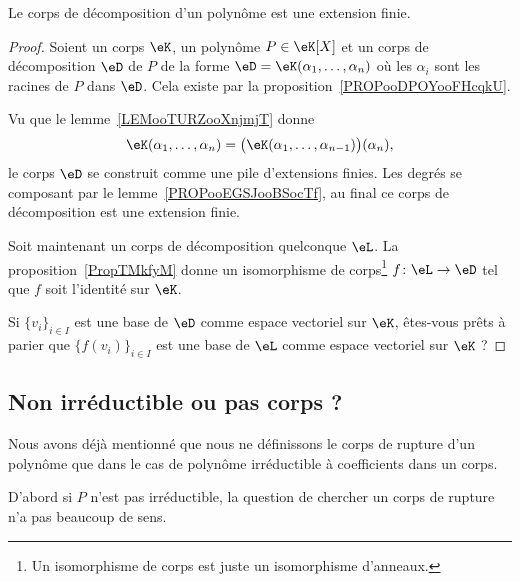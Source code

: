 \begin{corollary}    \label{CORooELAUooPQGLkR}
	Le corps de décomposition d'un polynôme est une extension finie.
\end{corollary}

\begin{proof}
	Soient un corps \( \eK\), un polynôme \( P\in \eK[X]\) et un corps de décomposition \( \eD\) de \( P\) de la forme \( \eD=\eK(\alpha_1,\ldots, \alpha_n)\) où les \( \alpha_i\) sont les racines de \( P\) dans \( \eD\). Cela existe par la proposition~\ref{PROPooDPOYooFHcqkU}.

	Vu que le lemme~\ref{LEMooTURZooXnjmjT} donne
	\begin{equation}
		\eK(\alpha_1,\ldots, \alpha_n)=\big( \eK(\alpha_1,\ldots, \alpha_{n-1}) \big)(\alpha_n),
	\end{equation}
	le corps \( \eD\) se construit comme une pile d'extensions finies. Les degrés se composant par le lemme~\ref{PROPooEGSJooBSocTf}, au final ce corps de décomposition est une extension finie.

	Soit maintenant un corps de décomposition quelconque \( \eL\). La proposition~\ref{PropTMkfyM} donne un isomorphisme de corps\footnote{Un isomorphisme de corps est juste un isomorphisme d'anneaux.} \( f\colon \eL\to \eD\) tel que \( f\) soit l'identité sur \( \eK\).

	Si \( \{ v_i \}_{i\in I}\) est une base de \( \eD\) comme espace vectoriel sur \( \eK\), êtes-vous prêts à parier que \( \{ f(v_i) \}_{i\in I}\) est une base de \( \eL\) comme espace vectoriel sur \( \eK\) ?
\end{proof}

\subsection{Non irréductible ou pas corps ?}
\label{SUBSECooEDMJooTXBfOu}

Nous avons déjà mentionné que nous ne définissons le corps de rupture d'un polynôme que dans le cas de polynôme irréductible à coefficients dans un corps.

D'abord si \( P\) n'est pas irréductible, la question de chercher un corps de rupture n'a pas beaucoup de sens.

